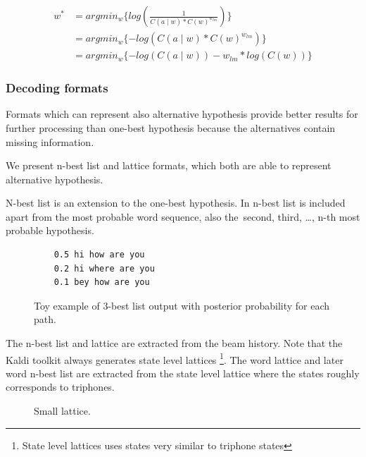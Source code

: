 {\begin{equation}\label{eq:am_lm}
    \begin{split}
        w^* &= argmin_{w}\{log(\frac{1}{C(a \mid w) * C(w)^{w_{lm}}})\} \\
        &= argmin_{w}\{-log(C(a \mid w) * C(w)^{w_{lm}})\} \\
        &= argmin_{w}\{-log(C(a \mid w)) - w_{lm}*log( C(w))\} 
    \end{split}
\end{equation}

\subsubsection*{Decoding formats}
Formats which can represent also alternative hypothesis provide better results for further processing than one-best hypothesis because the alternatives contain missing information.

We present n-best list and lattice formats, which both are able to represent alternative hypothesis.

N-best list is an extension to the one-best hypothesis. 
In n-best list is included apart from the most probable word sequence, also the~second, third, \ldots, n-th most probable hypothesis. 

\begin{figure}[!htp]
    \begin{center}
\begin{verbatim}
    0.5 hi how are you
    0.2 hi where are you
    0.1 bey how are you
\end{verbatim}
    \caption{Toy example of 3-best list output with posterior probability for each path.}
    \label{fig:nbest} 
    \end{center}
\end{figure}

The n-best list and lattice are extracted from the beam history.
Note that the Kaldi toolkit always generates state level lattices \cite{povey2012generating}\footnote{State level lattices uses states very similar to triphone states}. 
The word lattice and later word n-best list are extracted from the state level lattice where the states roughly corresponds to triphones. 

\begin{figure}[!htp]
    \begin{center}
    
    \caption{Small lattice. }
    \label{fig:toy_lat} 
    \end{center}
\end{figure}

}
